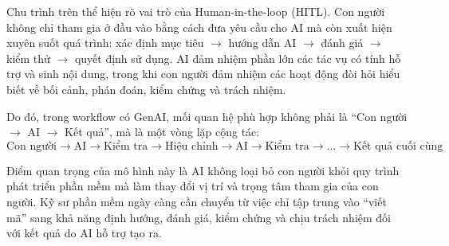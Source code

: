 Chu trình trên thể hiện rõ vai trò của Human-in-the-loop (HITL). Con người không chỉ tham gia ở đầu vào bằng cách đưa yêu cầu cho AI mà còn xuất hiện xuyên suốt quá trình: xác định mục tiêu $\rightarrow$ hướng dẫn AI $\rightarrow$ đánh giá $\rightarrow$ kiểm thử $\rightarrow$ quyết định sử dụng. AI đảm nhiệm phần lớn các tác vụ có tính hỗ trợ và sinh nội dung, trong khi con người đảm nhiệm các hoạt động đòi hỏi hiểu biết về bối cảnh, phán đoán, kiểm chứng và trách nhiệm.

Do đó, trong workflow có GenAI, mối quan hệ phù hợp không phải là ``Con người $\rightarrow$ AI $\rightarrow$ Kết quả'', mà là một vòng lặp cộng tác:
\[
\text{Con người} \rightarrow \text{AI} \rightarrow \text{Kiểm tra} \rightarrow \text{Hiệu chỉnh} \rightarrow \text{AI} \rightarrow \text{Kiểm tra} \rightarrow \dots \rightarrow \text{Kết quả cuối cùng}
\]

Điểm quan trọng của mô hình này là AI không loại bỏ con người khỏi quy trình phát triển phần mềm mà làm thay đổi vị trí và trọng tâm tham gia của con người. Kỹ sư phần mềm ngày càng cần chuyển từ việc chỉ tập trung vào ``viết mã'' sang khả năng định hướng, đánh giá, kiểm chứng và chịu trách nhiệm đối với kết quả do AI hỗ trợ tạo ra.
